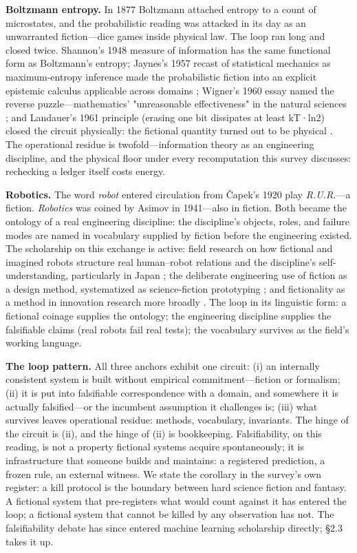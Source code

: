 \documentclass[11pt,a4paper]{article}
\begin{document}
\textbf{Boltzmann entropy.} In 1877 Boltzmann attached entropy to a count of microstates, and the probabilistic reading was attacked in its day as an unwarranted fiction—dice games inside physical law. The loop ran long and closed twice. Shannon's 1948 measure of information has the same functional form as Boltzmann's entropy; Jaynes's 1957 recast of statistical mechanics as maximum-entropy inference made the probabilistic fiction into an explicit epistemic calculus applicable across domains \cite{key19}; Wigner's 1960 essay named the reverse puzzle—mathematics' "unreasonable effectiveness" in the natural sciences \cite{key20}; and Landauer's 1961 principle (erasing one bit dissipates at least kT·ln2) closed the circuit physically: the fictional quantity turned out to be physical \cite{key21}. The operational residue is twofold—information theory as an engineering discipline, and the physical floor under every recomputation this survey discusses: rechecking a ledger itself costs energy.

\textbf{Robotics.} The word \textit{robot} entered circulation from Čapek's 1920 play \textit{R.U.R.}—a fiction. \textit{Robotics} was coined by Asimov in 1941—also in fiction. Both became the ontology of a real engineering discipline: the discipline's objects, roles, and failure modes are named in vocabulary supplied by fiction before the engineering existed. The scholarship on this exchange is active: field research on how fictional and imagined robots structure real human–robot relations and the discipline's self-understanding, particularly in Japan \cite{key22}; the deliberate engineering use of fiction as a design method, systematized as science-fiction prototyping \cite{key23}; and fictionality as a method in innovation research more broadly \cite{key24}. The loop in its linguistic form: a fictional coinage supplies the ontology; the engineering discipline supplies the falsifiable claims (real robots fail real tests); the vocabulary survives as the field's working language.

\textbf{The loop pattern.} All three anchors exhibit one circuit: (i) an internally consistent system is built without empirical commitment—fiction or formalism; (ii) it is put into falsifiable correspondence with a domain, and somewhere it is actually falsified—or the incumbent assumption it challenges is; (iii) what survives leaves operational residue: methods, vocabulary, invariants. The hinge of the circuit is (ii), and the hinge of (ii) is bookkeeping. Falsifiability, on this reading, is not a property fictional systems acquire spontaneously; it is infrastructure that someone builds and maintains: a registered prediction, a frozen rule, an external witness. We state the corollary in the survey's own register: a kill protocol is the boundary between hard science fiction and fantasy. A fictional system that pre-registers what would count against it has entered the loop; a fictional system that cannot be killed by any observation has not. The falsifiability debate has since entered machine learning scholarship directly; §2.3 takes it up.
\end{document}
